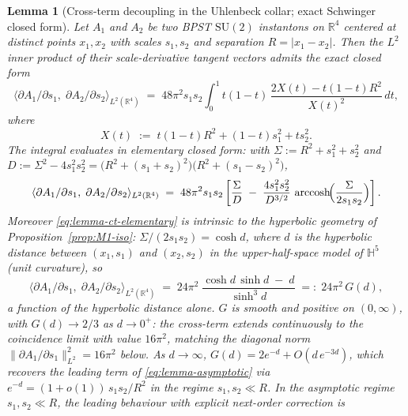 \documentclass[11pt,letterpaper]{article}
\newtheorem{lemma}[theorem]{Lemma}
\theoremstyle{definition}
\newcommand{\bbR}{\mathbb{R}}
\newcommand{\bbH}{\mathbb{H}}
\begin{document}
\begin{lemma}[Cross-term decoupling in the Uhlenbeck collar; exact Schwinger closed form]\label{lem:cross-term}
Let $A_1$ and $A_2$ be two BPST $\mathrm{SU}(2)$ instantons on $\bbR^4$ centered at distinct points $x_1, x_2$ with scales $s_1, s_2$ and separation $R = |x_1 - x_2|$. Then the $L^2$ inner product of their scale-derivative tangent vectors admits the exact closed form
\begin{equation}\label{eq:lemma-cross-term-exact}
\langle \partial A_1/\partial s_1,\;\partial A_2/\partial s_2\rangle_{L^2(\bbR^4)}
\;=\; 48\pi^2 s_1 s_2 \int_0^1 t(1-t)\,\frac{2X(t) - t(1-t)R^2}{X(t)^2}\,dt,
\end{equation}
where
\begin{equation}\label{eq:lemma-X-def}
X(t) \;:=\; t(1-t)R^2 + (1-t)s_1^2 + t s_2^2.
\end{equation}
The integral evaluates in elementary closed form: with $\Sigma := R^2 + s_1^2 + s_2^2$ and
$D := \Sigma^2 - 4 s_1^2 s_2^2 = \bigl(R^2 + (s_1+s_2)^2\bigr)\bigl(R^2 + (s_1-s_2)^2\bigr)$,
\begin{equation}\label{eq:lemma-ct-elementary}
\langle \partial A_1/\partial s_1,\;\partial A_2/\partial s_2\rangle_{L^2(\bbR^4)}
\;=\; 48\pi^2 s_1 s_2\left[\frac{\Sigma}{D} \;-\; \frac{4 s_1^2 s_2^2}{D^{3/2}}\,\operatorname{arccosh}\!\Bigl(\frac{\Sigma}{2 s_1 s_2}\Bigr)\right].
\end{equation}
Moreover \eqref{eq:lemma-ct-elementary} is intrinsic to the hyperbolic geometry of Proposition~\ref{prop:M1-iso}: $\Sigma/(2 s_1 s_2) = \cosh d$, where $d$ is the hyperbolic distance between $(x_1, s_1)$ and $(x_2, s_2)$ in the upper-half-space model of $\bbH^5$ (unit curvature), so
\begin{equation}\label{eq:lemma-ct-hyperbolic}
\langle \partial A_1/\partial s_1,\;\partial A_2/\partial s_2\rangle_{L^2(\bbR^4)}
\;=\; 24\pi^2\;\frac{\cosh d\,\sinh d \;-\; d}{\sinh^3 d}\;=:\;24\pi^2\,G(d),
\end{equation}
a function of the hyperbolic distance alone. $G$ is smooth and positive on $(0, \infty)$, with $G(d) \to 2/3$ as $d \to 0^{+}$: the cross-term extends continuously to the coincidence limit with value $16\pi^2$, matching the diagonal norm $\|\partial A_1/\partial s_1\|^2_{L^2} = 16\pi^2$ below. As $d \to \infty$, $G(d) = 2e^{-d} + O(d\,e^{-3d})$, which recovers the leading term of \eqref{eq:lemma-asymptotic} via $e^{-d} = (1+o(1))\,s_1 s_2/R^2$ in the regime $s_1, s_2 \ll R$.
In the asymptotic regime $s_1, s_2 \ll R$, the leading behaviour with explicit next-order correction is

\end{lemma}
\end{document}
